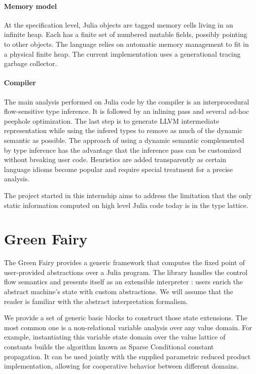 \documentclass[11pt]{article}
\begin{document}
\paragraph{Memory model} At the specification level, Julia objects are tagged memory cells living in an infinite heap. Each has a finite set of numbered mutable fields, possibly pointing to other objects. The language relies on automatic memory management to fit in a physical finite heap.
The current implementation uses a generational tracing garbage collector. %

\paragraph{Compiler} The main analysis performed on Julia code by the compiler is an interprocedural flow-sensitive type inference. It is followed by an inlining pass and several ad-hoc peephole optimization. The last step is to generate LLVM intermediate representation while using the infered types to remove as much of the dynamic semantic as possible.
The approach of using a dynamic semantic complemented by type inference has the advantage that the inference pass can be customized without breaking user code.
Heuristics are added transparently as certain language idioms become popular and require special treatment for a precise analysis.

The project started in this internship aims to address the limitation that the only static information computed on high level Julia code today is in the type lattice.

\section*{Green Fairy}

The Green Fairy provides a generic framework that computes the fixed point of user-provided abstractions over a Julia program.
The library handles the control flow semantics and presents itself as an extensible interpreter : users enrich the abstract machine's state with custom abstractions.
We will assume that the reader is familiar with the abstract interpretation\cite{absint-cousot} formalism.

We provide a set of generic basic blocks to construct those state extensions.
The most common one is a non-relational variable analysis over any value domain.
For example, instantiating this variable state domain over the value lattice of constants builds the algorithm known as Sparse Conditional constant propagation\cite{sparsecp}.
It can be used jointly with the supplied parametric reduced product\cite{redprod} implementation, allowing for cooperative behavior between different domains.
\end{document}
